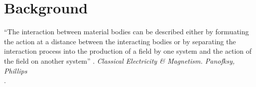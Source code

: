 \chapter{Background}
\begin{center}
  \begin{minipage}{0.75\textwidth}
    \begin{small}
      “The interaction between material bodies can be described either by formuating the action at a distance between the interacting bodies or by separating the interaction process into the production of a field by one system and the action of the field on another system” .
      \emph{Classical Electricity \& Magnetism. Panofksy, Phillips}\\.
    \end{small}
  \end{minipage}
  \vspace{0.5cm}
\end{center}





